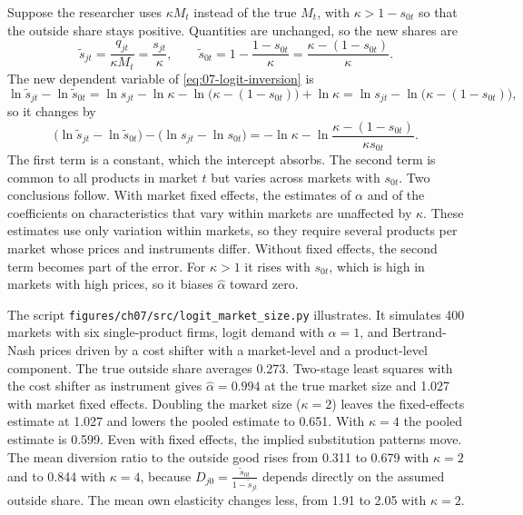 \begin{example}\label{ex:07-market-size}
Suppose the researcher uses $\kappa M_t$ instead of the true $M_t$, with $\kappa > 1 - s_{0t}$ so that the
outside share stays positive. Quantities are unchanged, so the new shares are
\begin{equation*}
  \tilde s_{jt} = \frac{q_{jt}}{\kappa M_t} = \frac{s_{jt}}{\kappa}, \qquad
  \tilde s_{0t} = 1 - \frac{1 - s_{0t}}{\kappa} = \frac{\kappa - (1 - s_{0t})}{\kappa} .
\end{equation*}
The new dependent variable of \eqref{eq:07-logit-inversion} is
\begin{equation*}
  \ln\tilde s_{jt} - \ln\tilde s_{0t}
  = \ln s_{jt} - \ln\kappa - \ln\big(\kappa - (1 - s_{0t})\big) + \ln\kappa
  = \ln s_{jt} - \ln\big(\kappa - (1 - s_{0t})\big),
\end{equation*}
so it changes by
\begin{equation}\label{eq:07-market-size-shift}
  \big(\ln\tilde s_{jt} - \ln\tilde s_{0t}\big) - \big(\ln s_{jt} - \ln s_{0t}\big)
  = -\ln\kappa - \ln\frac{\kappa - (1 - s_{0t})}{\kappa s_{0t}} .
\end{equation}
The first term is a constant, which the intercept absorbs. The second term is common to all products in market
$t$ but varies across markets with $s_{0t}$. Two conclusions follow. With market fixed effects, the estimates of
$\alpha$ and of the coefficients on characteristics that vary within markets are unaffected by $\kappa$. These
estimates use only variation within markets, so they require several products per market whose prices and instruments differ.
Without fixed effects, the second term becomes part of the error. For $\kappa > 1$ it rises with $s_{0t}$, which is high in
markets with high prices, so it biases $\hat\alpha$ toward zero.

The script \texttt{figures/ch07/src/logit\_market\_size.py} illustrates. It simulates 400 markets with six
single-product firms, logit demand with $\alpha = 1$, and Bertrand-Nash prices driven by a cost shifter with a
market-level and a product-level component. The true outside share averages 0.273. Two-stage least squares
with the cost shifter as instrument gives $\hat\alpha = 0.994$ at the true market size and 1.027 with market
fixed effects. Doubling the market size ($\kappa = 2$) leaves the fixed-effects estimate at 1.027 and lowers
the pooled estimate to 0.651. With $\kappa = 4$ the pooled estimate is 0.599. Even with fixed effects, the
implied substitution patterns move. The mean diversion ratio to the outside good rises from 0.311 to 0.679
with $\kappa = 2$ and to 0.844 with $\kappa = 4$, because $D_{j0} = \frac{\tilde s_{0t}}{1 - \tilde s_{jt}}$
depends directly on the assumed outside share. The mean own elasticity changes less, from 1.91 to 2.05 with
$\kappa = 2$.
\end{example}

